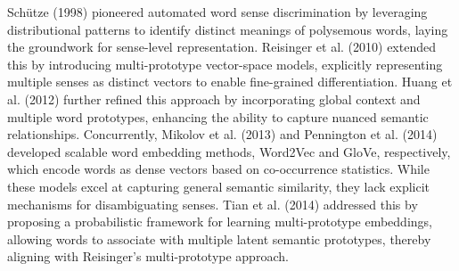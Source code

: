 \documentclass[conference]{IEEEtran}
\begin{document}
Sch\"utze (1998) pioneered automated word sense discrimination by leveraging distributional patterns to identify distinct meanings of polysemous words, laying the groundwork for sense-level representation. Reisinger et al. (2010) extended this by introducing multi-prototype vector-space models, explicitly representing multiple senses as distinct vectors to enable fine-grained differentiation. Huang et al. (2012) further refined this approach by incorporating global context and multiple word prototypes, enhancing the ability to capture nuanced semantic relationships. Concurrently, Mikolov et al. (2013) and Pennington et al. (2014) developed scalable word embedding methods, Word2Vec and GloVe, respectively, which encode words as dense vectors based on co-occurrence statistics. While these models excel at capturing general semantic similarity, they lack explicit mechanisms for disambiguating senses. Tian et al. (2014) addressed this by proposing a probabilistic framework for learning multi-prototype embeddings, allowing words to associate with multiple latent semantic prototypes, thereby aligning with Reisinger's multi-prototype approach.
\end{document}
